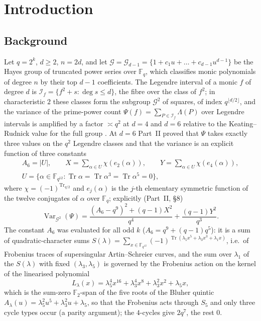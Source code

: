 ﻿\documentclass[12pt,a4paper]{amsart}
\theoremstyle{definition}
\newcommand{\F}{\mathbb{F}}
\newcommand{\G}{\mathcal{G}}
\newcommand{\Tr}{\operatorname{Tr}}
\newcommand{\Var}{\operatorname{Var}}
\begin{document}
\maketitle
\tableofcontents

\section{Introduction}

\subsection{Background}
Let $q=2^k$, $d\ge2$, $n=2d$, and let $\G=\G_{d-1}=\{1+c_1u+\dots+c_{d-1}u^{d-1}\}$ be the Hayes group of truncated power series over $\F_q$, which classifies monic polynomials of degree $n$ by their top $d-1$ coefficients. The Legendre interval of a monic $f$ of degree $d$ is $\mathcal I_f=\{f^2+s:\deg s\le d\}$, the fibre over the class of $f^2$; in characteristic $2$ these classes form the subgroup $\G^2$ of squares, of index $q^{\lfloor d/2\rfloor}$, and the variance of the prime-power count $\Psi(f)=\sum_{P\in\mathcal I_f}\Lambda(P)$ over Legendre intervals is amplified by a factor $\asymp q^2$ at $d=4$ and $d=6$ relative to the Keating--Rudnick value for the full group \cite{Chen,ChenII}. At $d=6$ Part~II \cite{ChenII} proved that $\Psi$ takes exactly three values on the $q^2$ Legendre classes and that the variance is an explicit function of three constants
\begin{gather*}
A_6=|U|,\qquad X=\sum_{\alpha\in U}\chi(e_2(\alpha)),\qquad Y=\sum_{\alpha\in U}\chi(e_4(\alpha)),\\
U=\{\alpha\in\F_{q^{12}}:\Tr\alpha=\Tr\alpha^3=\Tr\alpha^5=0\},
\end{gather*}
where $\chi=(-1)^{\Tr_{q/2}}$ and $e_j(\alpha)$ is the $j$-th elementary symmetric function of the twelve conjugates of $\alpha$ over $\F_q$; explicitly (Part~II, \S8)
\[
\Var_{\G^2}(\Psi)=\frac{(A_6-q^9)^2+(q-1)X^2}{q^4}+\frac{(q-1)Y^2}{q^3}.
\]
The constant $A_6$ was evaluated for all odd $k$ ($A_6=q^9+(q-1)q^5$): it is a sum of quadratic-character sums $S(\lambda)=\sum_{x\in\F_{q^{12}}}(-1)^{\Tr(\lambda_5x^5+\lambda_3x^3+\lambda_1x)}$, i.e.\ of Frobenius traces of supersingular Artin--Schreier curves, and the sum over $\lambda_1$ of the $S(\lambda)$ with fixed $(\lambda_3,\lambda_5)$ is governed by the Frobenius action on the kernel of the linearised polynomial
\[
L_\lambda(x)=\lambda_5^4x^{16}+\lambda_3^4x^8+\lambda_3^2x^2+\lambda_5x ,
\]
which is the sum-zero $\F_2$-span of the five roots of the Bluher quintic $A_\lambda(u)=\lambda_5^2u^5+\lambda_3^2u+\lambda_5$, so that the Frobenius acts through $S_5$ and only three cycle types occur (a parity argument); the $4$-cycles give $2q^7$, the rest $0$.
\end{document}
